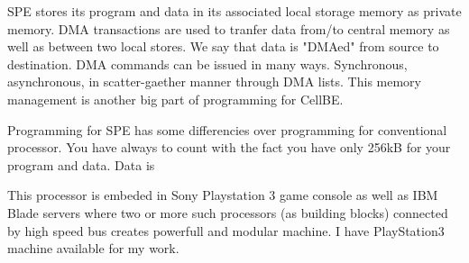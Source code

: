 SPE stores its program and data in its associated local storage memory as private memory. DMA transactions are used to tranfer data from/to central memory as well as between two local stores. We say that data is "DMAed" from source to destination. DMA commands can be issued in many ways. Synchronous, asynchronous, in scatter-gaether manner through DMA lists. This memory management is another big part of programming for CellBE.

Programming for SPE has some differencies over programming for conventional processor. You have always to count with the fact you have only 256kB for your program and data. Data is 

This processor is embeded in Sony Playstation 3 game console as well as IBM Blade servers where two or more such processors (as building blocks) connected by high speed bus creates powerfull and modular machine. I have PlayStation3 machine available for my work.